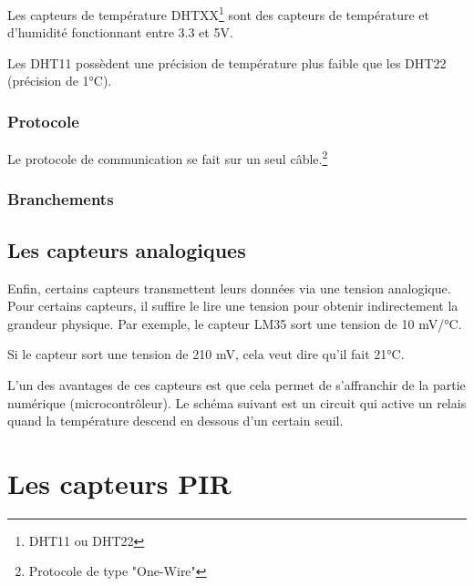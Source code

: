 Les capteurs de température DHTXX\footnote{DHT11 ou DHT22} sont des capteurs de température et d'humidité fonctionnant entre 3.3 et 5V.

Les DHT11 possèdent une précision de température plus faible que les DHT22 (précision de 1°C).

\subsubsection{Protocole}

Le protocole de communication se fait sur un seul câble.\footnote{Protocole de type "One-Wire"}


\subsubsection{Branchements}


\subsection{Les capteurs analogiques}

Enfin, certains capteurs transmettent leurs données via une tension analogique. \\
Pour certains capteurs, il suffire le lire une tension pour obtenir indirectement la grandeur physique. Par exemple, le capteur LM35 sort une tension de 10 mV/°C.\\


Si le capteur sort une tension de 210 mV, cela veut dire qu'il fait 21°C.


L'un des avantages de ces capteurs est que cela permet de s'affranchir de la partie numérique (microcontrôleur).
Le schéma suivant est un circuit qui active un relais quand la température descend en dessous d'un certain seuil.\\


\section{Les capteurs PIR}


